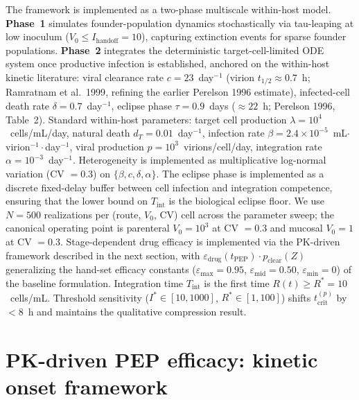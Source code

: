 \documentclass[10pt,letterpaper]{article}
\theoremstyle{definition}
\theoremstyle{remark}
\newcommand{\Tint}{T_{\text{int}}}
\newcommand{\tcrit}{t_{\text{crit}}}
\newcommand{\emax}{\varepsilon_{\max}}
\newcommand{\emid}{\varepsilon_{\text{mid}}}
\newcommand{\emin}{\varepsilon_{\min}}
\begin{document}
The framework is implemented as a two-phase multiscale within-host model. \textbf{Phase~1} simulates founder-population dynamics stochastically via tau-leaping at low inoculum ($V_{0} \leq I_{\text{handoff}} = 10$), capturing extinction events for sparse founder populations. \textbf{Phase~2} integrates the deterministic target-cell-limited ODE system once productive infection is established, anchored on the within-host kinetic literature: viral clearance rate $c = 23$~day$^{-1}$ (virion $t_{1/2} \approx 0.7$~h; Ramratnam et al.\ 1999\cite{ramratnam1999}, refining the earlier Perelson 1996\cite{perelson1996} estimate), infected-cell death rate $\delta = 0.7$~day$^{-1}$\cite{perelson1996}, eclipse phase $\tau = 0.9$~days ($\approx 22$~h; Perelson 1996, Table~2). Standard within-host parameters\cite{mcmichael2010}: target cell production $\lambda = 10^{4}$~cells/mL/day, natural death $d_{T} = 0.01$~day$^{-1}$, infection rate $\beta = 2.4 \times 10^{-5}$~mL$\cdot$virion$^{-1}\cdot$day$^{-1}$, viral production $p = 10^{3}$~virions/cell/day, integration rate $\alpha = 10^{-3}$~day$^{-1}$. Heterogeneity is implemented as multiplicative log-normal variation (CV $= 0.3$) on $\{\beta, c, \delta, \alpha\}$. The eclipse phase is implemented as a discrete fixed-delay buffer between cell infection and integration competence, ensuring that the lower bound on $\Tint$ is the biological eclipse floor. We use $N = 500$ realizations per (route, $V_{0}$, CV) cell across the parameter sweep; the canonical operating point is parenteral $V_{0} = 10^{3}$ at CV $= 0.3$ and mucosal $V_{0} = 1$ at CV $= 0.3$. Stage-dependent drug efficacy is implemented via the PK-driven framework described in the next section, with $\varepsilon_{\text{drug}}(t_{\text{PEP}}) \cdot p_{\text{clear}}(Z)$ generalizing the hand-set efficacy constants ($\emax = 0.95$, $\emid = 0.50$, $\emin = 0$) of the baseline formulation. Integration time $\Tint$ is the first time $R(t) \geq R^{*} = 10$~cells/mL. Threshold sensitivity ($I^{*} \in [10, 1000]$, $R^{*} \in [1, 100]$) shifts $\tcrit^{(p)}$ by $<8$~h and maintains the qualitative compression result.


\section*{PK-driven PEP efficacy: kinetic onset framework}
\end{document}
